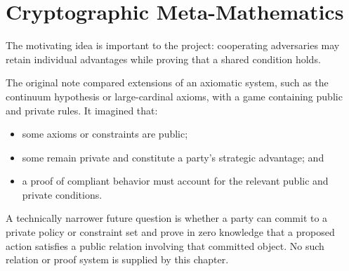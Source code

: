 \chapter{Cryptographic Meta-Mathematics}
\label{chap:cryptographic-meta-mathematics}


The motivating idea is important to the project: cooperating adversaries may
retain individual advantages while proving that a shared condition holds.

The original note compared extensions of an axiomatic system, such as the
continuum hypothesis or large-cardinal axioms, with a game containing public
and private rules. It imagined that:

\begin{itemize}
  \item some axioms or constraints are public;
  \item some remain private and constitute a party's strategic advantage; and
  \item a proof of compliant behavior must account for the relevant public and
  private conditions.
\end{itemize}

A technically narrower future question is whether a party can commit to a
private policy or constraint set and prove in zero knowledge that a proposed
action satisfies a public relation involving that committed object. No such
relation or proof system is supplied by this chapter.
